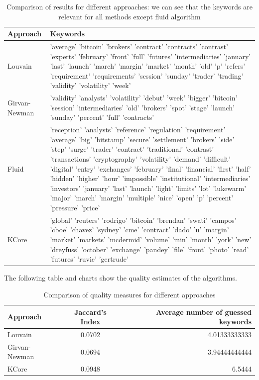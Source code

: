 \documentclass[a4paper]{article}
\begin{document}
\begin{table}[h!]
\center
\begin{tabular}{|p{3cm}|p{14cm}|}
\hline
Approach & Keywords \\
\hline
Louvain & 'average' 'bitcoin' 'brokers' 'contract' 'contracts' 'contrast' 'experts'
 'february' 'front' 'full' 'futures' 'intermediaries' 'january' 'last'
 'launch' 'march' 'margin' 'market' 'month' 'old' 'p' 'refers'
 'requirement' 'requirements' 'session' 'sunday' 'trader' 'trading'
 'validity' 'volatility' 'week' \\
 \hline
Girvan-Newman & 'validity' 'analysts' 'volatility' 'debut' 'week' 'bigger' 'bitcoin'
 'session' 'intermediaries' 'old' 'brokers' 'spot' 'stage' 'launch'
 'sunday' 'percent' 'full' 'contracts'\\
 \hline
Fluid & 'reception' 'analysts' 'reference' 'regulation' 'requirement' 'average'
 'big' 'bitstamp' 'secure' 'settlement' 'brokers' 'side' 'step' 'surge'
 'trader' 'contract' 'traditional' 'contrast' 'transactions' 'cryptography'
 'volatility' 'demand' 'difficult' 'digital' 'entry' 'exchanges' 'february'
 'final' 'financial' 'first' 'half' 'hidden' 'higher' 'hour' 'impossible'
 'institutional' 'intermediaries' 'investors' 'january' 'last' 'launch'
 'light' 'limits' 'lot' 'lukewarm' 'major' 'march' 'margin' 'multiple'
 'nice' 'open' 'p' 'percent' 'pressure' 'price'\\
 \hline
KCore & 'global' 'reuters' 'rodrigo' 'bitcoin' 'brendan' 'swati' 'campos' 'cboe'
 'chavez' 'sydney' 'cme' 'contract' 'dado' 'u' 'margin' 'market' 'markets'
 'mcdermid' 'volume' 'min' 'month' 'york' 'new' 'dreyfuss' 'october'
 'exchange' 'pandey' 'file' 'front' 'photo' 'read' 'futures' 'ruvic'
 'gertrude'  \\
 \hline
\end{tabular}
\caption{Comparison of results for different approaches: we can see that the keywords are relevant for all methods except fluid algorithm}
\end{table}

\clearpage


The following table and charts show the quality estimates of the algorithms.

\begin{table}[h!]
\center
\begin{tabular}{|l|c|r|}
\hline
Approach & Jaccard's Index & Average number of guessed keywords \\
\hline
Louvain & 0.0702 & 4.01333333333\\
 \hline
Girvan-Newman & 0.0694 & 3.94444444444\\
 \hline
KCore & 0.0948 & 6.5444\\
 \hline
\end{tabular}
\caption{Comparison of quality measures for different approaches}
\end{table}
\end{document}
